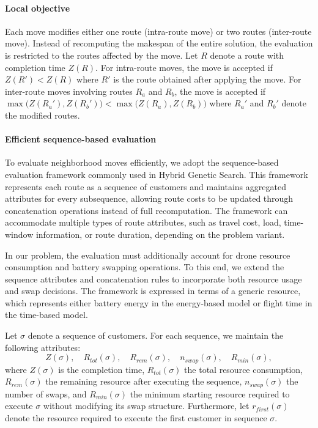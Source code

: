 \documentclass[3p, authoryear, 11pt]{elsarticle}
\begin{document}
\paragraph{Local objective}
Each move modifies either one route (intra-route move) or two routes (inter-route move). 
Instead of recomputing the makespan of the entire solution, the evaluation is restricted to the routes affected by the move. 
Let $R$ denote a route with completion time $Z(R)$. 
For intra-route moves, the move is accepted if
$
Z(R') < Z(R)
$
where $R'$ is the route obtained after applying the move.
For inter-route moves involving routes $R_a$ and $R_b$, the move is accepted if
$
\max \big(Z(R_a'), Z(R_b')\big)
<
\max \big(Z(R_a), Z(R_b)\big)
$
where $R_a'$ and $R_b'$ denote the modified routes.

\paragraph{Efficient sequence-based evaluation}

To evaluate neighborhood moves efficiently, we adopt the sequence-based evaluation framework commonly used in Hybrid Genetic Search. 
This framework represents each route as a sequence of customers and maintains aggregated attributes for every subsequence, allowing route costs to be updated through concatenation operations instead of full recomputation. The framework can accommodate multiple types of route attributes, such as travel cost, load, time-window information, or route duration, depending on the problem variant.

In our problem, the evaluation must additionally account for drone resource consumption and battery swapping operations. 
To this end, we extend the sequence attributes and concatenation rules to incorporate both resource usage and swap decisions.
The framework is expressed in terms of a generic resource, which represents either battery energy in the energy-based model or flight time in the time-based model.

Let $\sigma$ denote a sequence of customers. 
For each sequence, we maintain the following attributes:
\[
Z(\sigma), \quad
R_{tot}(\sigma), \quad
R_{rem}(\sigma), \quad
n_{swap}(\sigma), \quad
R_{min}(\sigma),
\]
where $Z(\sigma)$ is the completion time, $R_{tot}(\sigma)$ the total resource consumption, 
$R_{rem}(\sigma)$ the remaining resource after executing the sequence, 
$n_{swap}(\sigma)$ the number of swaps, 
and $R_{min}(\sigma)$ the minimum starting resource required to execute $\sigma$ without modifying its swap structure. Furthermore, let $r_{first}(\sigma)$ denote the resource required to execute the first customer in sequence $\sigma$.
\end{document}
